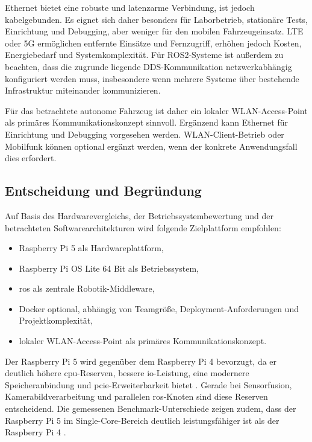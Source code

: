 Ethernet bietet eine robuste und latenzarme Verbindung, ist jedoch kabelgebunden. Es eignet sich daher besonders für Laborbetrieb, stationäre Tests, Einrichtung und Debugging, aber weniger für den mobilen Fahrzeugeinsatz. LTE oder 5G ermöglichen entfernte Einsätze und Fernzugriff, erhöhen jedoch Kosten, Energiebedarf und Systemkomplexität. Für ROS2-Systeme ist außerdem zu beachten, dass die zugrunde liegende DDS-Kommunikation netzwerkabhängig konfiguriert werden muss, insbesondere wenn mehrere Systeme über bestehende Infrastruktur miteinander kommunizieren.

Für das betrachtete autonome Fahrzeug ist daher ein lokaler WLAN-Access-Point als primäres Kommunikationskonzept sinnvoll. Ergänzend kann Ethernet für Einrichtung und Debugging vorgesehen werden. WLAN-Client-Betrieb oder Mobilfunk können optional ergänzt werden, wenn der konkrete Anwendungsfall dies erfordert.

\subsection{Entscheidung und Begründung}
\label{sec:entscheidung}

Auf Basis des Hardwarevergleichs, der Betriebssystembewertung und der betrachteten Softwarearchitekturen wird folgende Zielplattform empfohlen:

\begin{itemize}
    \item Raspberry Pi 5 als Hardwareplattform,
    \item Raspberry Pi OS Lite 64 Bit als Betriebssystem,
    \item \gls{ros} als zentrale Robotik-Middleware,
    \item Docker optional, abhängig von Teamgröße, Deployment-Anforderungen und Projektkomplexität,
    \item lokaler WLAN-Access-Point als primäres Kommunikationskonzept.
\end{itemize}

Der Raspberry Pi 5 wird gegenüber dem Raspberry Pi 4 bevorzugt, da er deutlich höhere \gls{cpu}-Reserven, bessere \gls{io}-Leistung, eine modernere Speicheranbindung und \gls{pcie}-Erweiterbarkeit bietet \cite[Abschnitte ``Overview'' und ``Specification'']{zotero-item-144}. Gerade bei Sensorfusion, Kamerabildverarbeitung und parallelen \gls{ros}-Knoten sind diese Reserven entscheidend. Die gemessenen Benchmark-Unterschiede zeigen zudem, dass der Raspberry Pi 5 im Single-Core-Bereich deutlich leistungsfähiger ist als der Raspberry Pi 4 \cite[Abschnitt ``Single core'']{zotero-item-146}.

